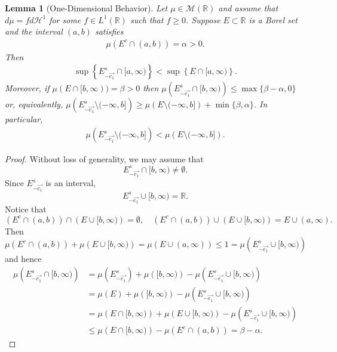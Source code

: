\documentclass[12pt]{amsart}
\numberwithin{equation}{section}
\theoremstyle{plain}
\newtheorem{lemma}[theorem]{Lemma}
\theoremstyle{definition}
\begin{document}
\begin{lemma}[One-Dimensional Behavior]\label{l:0}
    Let $\mu \in \mathcal{M}(\mathbb{R})$ and assume that $d\mu = fd\mathcal{H}^1$ for some $f \in L^1(\mathbb{R})$ such that $f\ge 0$. Suppose $E \subset \mathbb{R}$ is a Borel set and the interval $(a, b)$ satisfies 
    \begin{align*}
        \mu(E^c \cap (a, b)) = \alpha>0.
    \end{align*}
    Then 
    \begin{align}\label{e:symm shifts things down}
        \sup \left\{E^s_{-\vec{e_1}} \cap [a,\infty)\right\} < \sup \left\{E \cap [a, \infty)\right\}.
    \end{align}
    Moreover, if $\mu(E \cap [b, \infty)) = \beta>0$ then $\mu \left(E^s_{-\vec{e_1}} \cap [b,\infty)\right) \le \max\{ \beta - \alpha, 0\}$ or, equivalently, $\mu \left(E^s_{-\vec{e_1}} \setminus (-\infty,b]\right) \ge \mu \left(E \setminus (-\infty,b]\right) + \min \{  \beta, \alpha\}$.  In particular,
        \begin{align*}
        \mu \left(E^s_{-\vec{e_1}} \setminus (-\infty,b]\right) < \mu \left(E \setminus (-\infty,b]\right).
    \end{align*}
\end{lemma}
\begin{proof}
Without loss of generality, we may assume that 
$$E^s_{-\vec{e_1}} \cap [b,\infty)\not=\emptyset.$$
Since $E^s_{-\vec{e_1}}$ is an interval, 
$$E^s_{-\vec{e_1}}\cup [b,\infty)=\mathbb{R}.$$
Notice that
$$\left(E^c\cap (a,b)\right)\cap \left(E\cup [b,\infty)\right)=\emptyset,\quad \left(E^c\cap (a,b)\right)\cup \left(E\cup [b,\infty)\right)=E\cup (a,\infty).$$
Then
$$\mu\left(E^c\cap (a,b)\right)+\mu \left(E\cup [b,\infty)\right)=\mu\left(E\cup (a,\infty)\right)\leq 1=\mu\left(E^s_{-\vec{e_1}}\cup [b,\infty)\right)$$
and hence
\begin{align*}
\mu \left(E^s_{-\vec{e_1}} \cap [b,\infty)\right)&=\mu \left(E^s_{-\vec{e_1}}\right)+\mu \left( [b,\infty)\right)-\mu \left(E^s_{-\vec{e_1}} \cup [b,\infty)\right)\\
&=\mu \left(E\right)+\mu \left( [b,\infty)\right)-\mu \left(E^s_{-\vec{e_1}} \cup [b,\infty)\right)\\
&=\mu\left(E\cap [b,\infty)\right)+\mu \left(E\cup [b,\infty)\right)-\mu \left(E^s_{-\vec{e_1}} \cup [b,\infty)\right)\\
&\leq\mu\left(E\cap [b,\infty)\right)-\mu \left(E^c\cap (a,b)\right)=\beta-\alpha.
\end{align*}
\end{proof}
\end{document}
